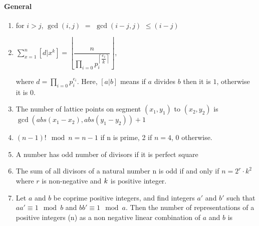 \begin{enumerate}

            \end{enumerate}
\paragraph{General}\begin{enumerate}

            \item for $i > j$, $\displaystyle \gcd(i, j)$ $ = $ $\displaystyle \gcd(i -j, j)$ $\displaystyle \leq (i
                -j)$
            
            \item 
                $\displaystyle \sum_{x = 1}^n \left[ d | x^k \right] = \left \lfloor\dfrac{n}{\prod_{i =
                    0}{p_i^{\left
                    \lceil
                    \dfrac{e_i}{k}\right \rceil}}}\right \rfloor$,

                where $d = \prod_{i = 0}{p_i^{e_i}}$. Here, $[a | b]$ means if $\displaystyle a$ divides $b$ then it
                    is
                    $\displaystyle 1$, otherwise it is $0$.

            
            \item The number of lattice points on segment $\displaystyle (x_1,y_1)$ to $\displaystyle (x_2,y_2)$ is
                $\displaystyle
                \gcd(abs(x_1-x_2),abs(y_1-y_2)) + 1$
            \item $\displaystyle (n-1)! \mod n = n -1$ if n is prime, 2 if $n = 4$, $0$ otherwise.
            \item A number has odd number of divisors if it is perfect square
            \item The sum of all divisors of a natural number n is odd if and only if $n=2^r\cdot k^2$ where $r$ is
                non-negative
                and $\displaystyle \displaystyle k$ is positive integer.
            \item 
                Let $\displaystyle a$ and $b$ be coprime positive integers, and find integers $\displaystyle
                    a{\prime}$
                    and
                    $b{\prime}$ such that $\displaystyle aa{\prime} \equiv 1 \mod b$ and $bb{\prime} \equiv 1 \mod a$.
                    Then
                    the
                    number of representations of a positive integers (n) as a non negative linear combination of
                    $\displaystyle
                    a$ and $b$ is


\end{enumerate}
